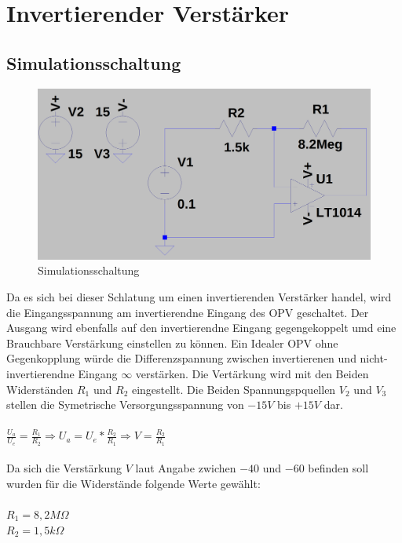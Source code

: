 
\section{Invertierender Verst\"arker}
\subsection{Simulationsschaltung}
\begin{figure}[H]
  \begin{center}
    \includegraphics[width=1\textwidth]{./Schaltungen/InvertierenderVerstaerker.png}
    \caption{Simulationsschaltung}
  \end{center}
\end{figure}
\noindent
Da es sich bei dieser Schlatung um einen invertierenden Verst\"arker handel, wird die Eingangsspannung am invertierendne Eingang des OPV geschaltet.
Der Ausgang wird ebenfalls auf den invertierendne Eingang gegengekoppelt umd eine Brauchbare Verst\"arkung einstellen zu k\"onnen. Ein Idealer OPV ohne Gegenkopplung w\"urde die Differenzspannung zwischen invertierenen und nicht-invertierendne Eingang $\infty$ verst\"arken. Die Vert\"arkung wird mit den Beiden Widerst\"anden $R_1$ und $R_2$ eingestellt. Die Beiden Spannungspquellen $V_2$ und $V_3$ stellen die Symetrische Versorgungsspannung von $-15V$ bis $+15V$ dar.\\ \\
$\frac{U_a}{U_e}=\frac{R_1}{R_2} \Rightarrow U_a=U_e*\frac{R_2}{R_1} \Rightarrow V=\frac{R_2}{R_1}$ \\ \\
Da sich die Verst\"arkung $V$ laut Angabe zwichen $-40$ und $-60$ befinden soll wurden f\"ur die Widerst\"ande folgende Werte gew\"ahlt: \\ \\
$R_1=8,2M\Omega$ \\
$R_2=1,5k\Omega$ \\
